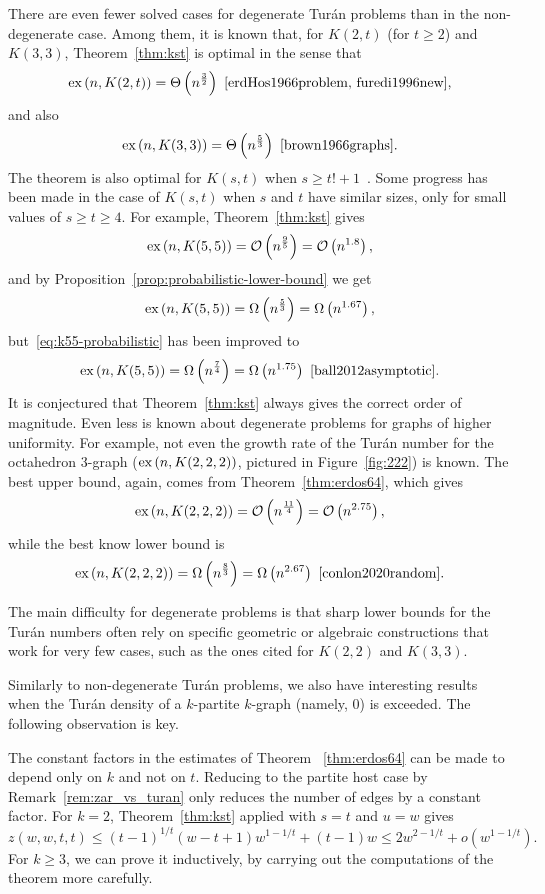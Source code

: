 There are even fewer solved cases for degenerate Turán problems than in the non-degenerate case.
Among them, it is known that, for $K(2, t)$ (for $t \geq 2$) and $K(3, 3)$,
Theorem~\ref{thm:kst} is optimal in the sense that
\[
    \text{ex} \left( n, K(2, t) \right) = \Theta\left(n^{\frac{3}{2}}\right)~\cite{erdHos1966problem, furedi1996new},
\]
and also
\[
    \text{ex} \left( n, K(3, 3) \right) = \Theta\left(n^{\frac{5}{3}}\right)~\cite{brown1966graphs}.
\]
The theorem is also optimal for $K(s, t)$ when $s \geq t! + 1$~\cite{kollar1996norm}.
Some progress has been made in the case of $K(s, t)$ when $s$ and $t$ have similar sizes,
only for small values of $s \geq t \geq 4$.
For example, Theorem~\ref{thm:kst} gives
\[
    \text{ex} \left( n, K(5,5) \right) = \mathcal{O}\left(n^{\frac{9}{5}}\right) = \mathcal{O}\left(n^{1.8}\right),
\]
and by Proposition~\ref{prop:probabilistic-lower-bound} we get
\begin{equation} \label{eq:k55-probabilistic}
    \text{ex} \left( n, K(5,5) \right) = \Omega\left(n^{\frac{5}{3}}\right) = \Omega\left(n^{1.67}\right),
\end{equation}
but~\eqref{eq:k55-probabilistic} has been improved to
\[
    \text{ex} \left( n, K(5,5) \right) = \Omega\left(n^{\frac{7}{4}}\right) = \Omega\left(n^{1.75}\right)~\cite{ball2012asymptotic}.
\]
It is conjectured that Theorem~\ref{thm:kst} always gives the correct order of magnitude.
Even less is known about degenerate problems for graphs of higher uniformity.
For example, not even the growth rate of the Turán number for the octahedron 3-graph
($\text{ex} \left( n, K(2, 2, 2) \right)$, pictured in Figure~\ref{fig:222}) is known.
The best upper bound, again, comes from Theorem~\ref{thm:erdos64}, which gives
\[
    \text{ex} \left( n, K(2, 2, 2) \right) = \mathcal{O}\left(n^{\frac{11}{4}}\right) = \mathcal{O}\left(n^{2.75}\right),
\]
while the best know lower bound is
\[
    \text{ex} \left( n, K(2, 2, 2) \right) = \Omega\left(n^{\frac{8}{3}}\right) = \Omega\left(n^{2.67}\right)~\cite{conlon2020random}.
\]

The main difficulty for degenerate problems is that sharp lower bounds for the Turán numbers
often rely on specific geometric or algebraic constructions that work for very few cases,
such as the ones cited for $K(2, 2)$ and $K(3, 3)$.

Similarly to non-degenerate Turán problems, we also have interesting results when the
Turán density of a $k$-partite $k$-graph (namely, $0$) is exceeded.
The following observation is key.

\begin{remark} \label{rem:uniform-t}
    The constant factors in the estimates of Theorem ~\ref{thm:erdos64} can be made to depend only on $k$ and not on $t$.
    Reducing to the partite host case by Remark~\ref{rem:zar_vs_turan} only reduces the number of edges by a constant factor.
    For $k=2$, Theorem~\ref{thm:kst} applied with $s = t$ and $u = w$
    gives
    \[
        z(w, w, t, t) \leq (t-1)^{1/t}(w-t+1)w^{1-1/t} + (t-1)w \leq 2w^{2 - 1/t} + o\left(w^{1-1/t}\right).
    \]
    For $k \geq 3$, we can prove it inductively, by carrying out the computations of the theorem more carefully.
\end{remark}

